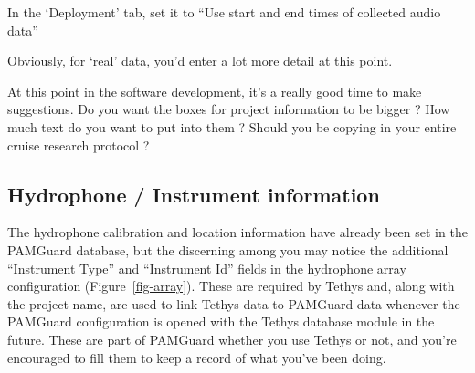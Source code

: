 \documentclass[
]{article}
\begin{document}
In the `Deployment' tab, set it to ``Use start and end times of
collected audio data''

Obviously, for `real' data, you'd enter a lot more detail at this point.

\begin{tcolorbox}[enhanced jigsaw, titlerule=0mm, rightrule=.15mm, opacitybacktitle=0.6, breakable, colframe=quarto-callout-tip-color-frame, coltitle=black, toptitle=1mm, bottomtitle=1mm, colback=white, title=\textcolor{quarto-callout-tip-color}{\faLightbulb}\hspace{0.5em}{No promises, but there is no harm in asking \ldots{}}, arc=.35mm, bottomrule=.15mm, left=2mm, leftrule=.75mm, toprule=.15mm, colbacktitle=quarto-callout-tip-color!10!white, opacityback=0]

At this point in the software development, it's a really good time to
make suggestions. Do you want the boxes for project information to be
bigger ? How much text do you want to put into them ? Should you be
copying in your entire cruise research protocol ?

\end{tcolorbox}

\subsection{Hydrophone / Instrument
information}\label{hydrophone-instrument-information}

The hydrophone calibration and location information have already been
set in the PAMGuard database, but the discerning among you may notice
the additional ``Instrument Type'' and ``Instrument Id'' fields in the
hydrophone array configuration (Figure~\ref{fig-array}). These are
required by Tethys and, along with the project name, are used to link
Tethys data to PAMGuard data whenever the PAMGuard configuration is
opened with the Tethys database module in the future. These are part of
PAMGuard whether you use Tethys or not, and you're encouraged to fill
them to keep a record of what you've been doing.
\end{document}

